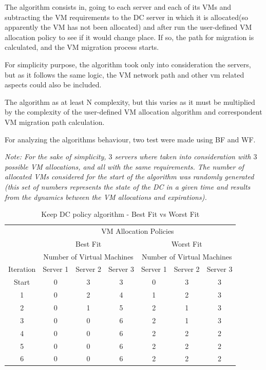 \documentclass[12pt,english,oneside]{book}
\begin{document}
The algorithm consists in, going to each server and each of its VMs and subtracting the VM requirements to the DC server in which it is allocated(so apparently the VM has not been allocated) and after run the user-defined VM allocation policy to see if it would change place.
If so, the path for migration is calculated, and the VM migration process starts.

For simplicity purpose, the algorithm took only into consideration the servers, but as it follows the same logic, the VM network path and other vm related aspects could also be included.

The algorithm as at least N complexity, but this varies as it must be multiplied by the complexity of the user-defined VM allocation algorithm and correspondent VM migration path calculation.

For analyzing the algorithms behaviour, two test were made using BF and WF.

\textit{Note: For the sake of simplicity, $3$ servers where taken into consideration with $3$ possible VM allocations, and all with the same requirements. The number of allocated VMs considered for the start of the algorithm was randomly generated (this set of numbers represents the state of the DC in a given time and results from the dynamics between the VM allocations and expirations).}

\begin{table}[h!tbp]
\begin{tabular}{lc|c|c||c|c|c|}
& \multicolumn{6}{c}{VM Allocation Policies} \\
\cline{2-7}
\multicolumn{1}{c|}{}& \multicolumn{3}{c||}{Best Fit} & \multicolumn{3}{c|}{Worst Fit} \\
\cline{2-7}
\multicolumn{1}{c|}{}& \multicolumn{3}{|c||}{Number of Virtual Machines}& \multicolumn{3}{c|}{Number of Virtual Machines} \\
\hline
\multicolumn{1}{|c|}{Iteration} & Server 1 & Server 2 & Server 3 & Server 1 & Server 2 & Server 3 \\
\hline
\multicolumn{1}{|c|}{Start} & 0 & 3 & 3 & 0 & 3 & 3 \\
\multicolumn{1}{|c|}{1} & 0 & 2 & 4 & 1 & 2 & 3 \\
\multicolumn{1}{|c|}{2} & 0 & 1 & 5 & 2 & 1 & 3 \\
\multicolumn{1}{|c|}{3} & 0 & 0 & 6 & 2 & 1 & 3 \\
\multicolumn{1}{|c|}{4} & 0 & 0 & 6 & 2 & 2 & 2 \\
\multicolumn{1}{|c|}{5} & 0 & 0 & 6 & 2 & 2 & 2 \\
\multicolumn{1}{|c|}{6} & 0 & 0 & 6 & 2 & 2 & 2 \\
\hline
\end{tabular}
\caption{Keep DC policy algorithm - Best Fit vs Worst Fit}
\label{table:keepdcpol}
\end{table}
\end{document}
